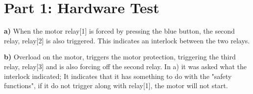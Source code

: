 \section{Part 1: Hardware Test}

\textbf{a)} When the motor relay[1] is forced by pressing the blue button, the second relay, relay[2] is also triggered. This indicates an interlock between the two relays.

\textbf{b)} Overload on the motor, triggers the motor protection, triggering the third relay, relay[3] and is also forcing off the second relay. In a) it was asked what the interlock indicated; It indicates that it has something to do with the "safety functions", if it do not trigger along with relay[1], the motor will not start.